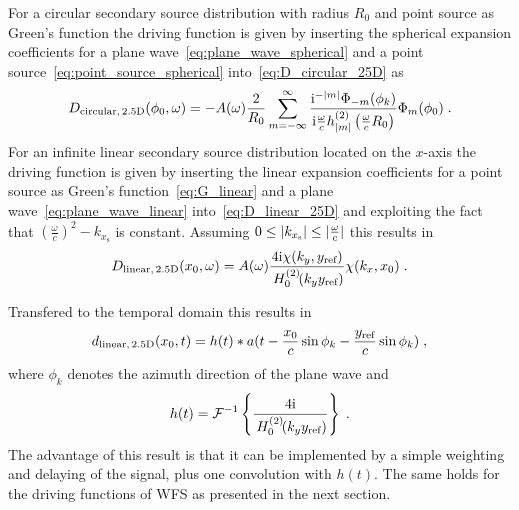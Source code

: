 For a circular secondary source distribution with radius $R_0$ and point source
as Green's function the \twohalfD driving function is given by inserting the
spherical expansion coefficients for a plane wave~\eqref{eq:plane_wave_spherical}
and a point source~\eqref{eq:point_source_spherical} into~\eqref{eq:D_circular_25D} as
%
\begin{equation}
    D_{\text{circular},\,\twohalfD}(\phi_0,\omega) = -A(\omega) \frac{2}{R_0}
    \sum_{m=-\infty}^\infty \frac{\I^{-|m|} \Phi_{-m}(\phi_k)} {\I\omegac
    h_{|m|}^{(2)}\left(\omegac R_0\right)} \Phi_m(\phi_0) \qp
    \label{eq:D_nfchoa_pw_25D}
\end{equation}
%
For an infinite linear secondary source distribution located on the $x$-axis the
\twohalfD driving function is given by inserting the linear expansion coefficients
for a point source as Green's function~\eqref{eq:G_linear} and
a plane wave~\eqref{eq:plane_wave_linear} into~\eqref{eq:D_linear_25D} and
exploiting the fact that $(\frac{\omega}{c})^2 - k_{x_\text{s}}$ is constant. Assuming
$0 \le |k_{x_\text{s}}| \le |\frac{\omega}{c}|$ this results
in
%
\begin{equation}
    D_{\text{linear},\,\twohalfD}(x_0,\omega) = A(\omega) \frac{4\I
    \chi(k_y,y_\text{ref})}
    {\H{0}{2}(k_y y_\text{ref})} \chi(k_x,x_0) \qp
    \label{eq:D_sdm_pw_25D}
\end{equation}
%

Transfered to the temporal domain this results
in
%
\begin{equation}
    d_{\text{linear},\,\twohalfD}(x_0,t) = h(t) *
    a(t-\frac{x_0}{c}\sin\phi_k-\frac{y_\text{ref}}{c}\sin\phi_k)
    \qc
    \label{eq:d_sdm_pw_25D}
\end{equation}
%
where $\phi_k$ denotes the azimuth direction of the plane wave and
\begin{equation}
h(t) =
 \mathcal{F}^{-1}\left\{\frac{4\mathrm{i}}{\,H_{0}^{(2)}\!(k_y y_\text{ref})}\right\} \;.
\end{equation}
The advantage of this
result is that it can be implemented by a simple weighting and delaying of
the signal, plus one convolution with $h(t)$. The same holds for the driving
functions of \ac{WFS} as presented in the next section.


